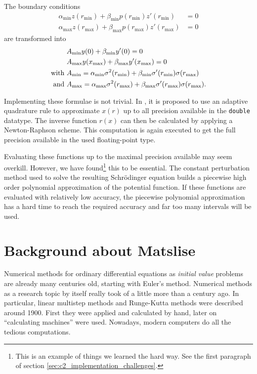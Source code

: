 The boundary conditions
\begin{align*}
    \alpha_\text{min} z(r_\text{min}) + \beta_\text{min} p(r_\text{min}) z'(r_\text{min}) &= 0 \\
    \alpha_\text{max} z(r_\text{max}) + \beta_\text{max} p(r_\text{max}) z'(r_\text{max}) &= 0
\end{align*}
are transformed into
\begin{align*}
    &A_\text{min} y(0) + \beta_\text{min} y'(0) = 0 \\
    &A_\text{max} y({x_{\text{max}}}) + \beta_\text{max} y'({x_{\text{max}}}) =0 \\
    \text{with } & A_\text{min} = \alpha_\text{min}\sigma^2(r_\text{min}) + \beta_\text{min}\sigma'(r_\text{min})\sigma(r_\text{max}) \\
    \text{and } & A_\text{max} = \alpha_\text{max}\sigma^2(r_\text{max}) + \beta_\text{max}\sigma'(r_\text{max})\sigma(r_\text{max})\text{.}
\end{align*}

Implementing these formulae is not trivial. In \cite{ledoux_study_2007}, it is proposed to use an adaptive quadrature rule to approximate $x(r)$ up to all precision available in the \texttt{double} datatype. The inverse function $r(x)$ can then be calculated by applying a Newton-Raphson scheme. This computation is again executed to get the full precision available in the used floating-point type.

Evaluating these functions up to the maximal precision available may seem overkill. However, we have found\footnote{This is an example of things we learned the hard way. See the first paragraph of section \ref{sec:c2_implementation_challenges}.} this to be essential. The constant perturbation method used to solve the resulting Schrödinger equation builds a piecewise high order polynomial approximation of the potential function. If these functions are evaluated with relatively low accuracy, the piecewise polynomial approximation has a hard time to reach the required accuracy and far too many intervals will be used.


\section{Background about Matslise}\label{sec:c2_background}

Numerical methods for ordinary differential equations as \emph{initial value} problems are already many centuries old, starting with Euler's method. Numerical methods as a research topic by itself really took of a little more than a century ago. In particular, linear multistep methods and Runge-Kutta methods were described around 1900. First they were applied and calculated by hand, later on ``calculating machines'' \cite{milne_numerical_1926} were used. Nowadays, modern computers do all the tedious computations.

